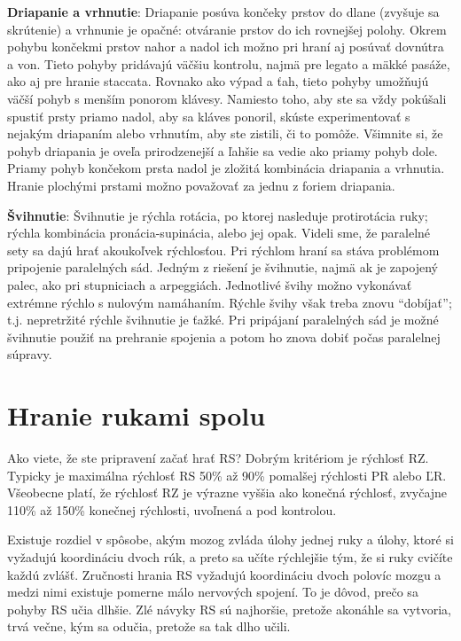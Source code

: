\documentclass[11pt,a4paper]{book}
\begin{document}
\textbf{Driapanie a vrhnutie}: Driapanie posúva končeky prstov do dlane (zvyšuje sa skrútenie) a vrhnunie je opačné: otváranie prstov do ich rovnejšej polohy. Okrem pohybu končekmi prstov nahor a nadol ich možno pri hraní aj posúvať dovnútra a von. Tieto pohyby pridávajú väčšiu kontrolu, najmä pre legato a mäkké pasáže, ako aj pre hranie staccata. Rovnako ako výpad a ťah, tieto pohyby umožňujú väčší pohyb s menším ponorom klávesy. Namiesto toho, aby ste sa vždy pokúšali spustiť prsty priamo nadol, aby sa kláves ponoril, skúste experimentovať s nejakým driapaním alebo vrhnutím, aby ste zistili, či to pomôže. Všimnite si, že pohyb driapania je oveľa prirodzenejší a ľahšie sa vedie ako priamy pohyb dole. Priamy pohyb končekom prsta nadol je zložitá kombinácia driapania a vrhnutia. Hranie plochými prstami možno považovať za jednu z foriem driapania.

\textbf{Švihnutie}: Švihnutie je rýchla rotácia, po ktorej nasleduje protirotácia ruky; rýchla kombinácia pronácia-supinácia, alebo jej opak. Videli sme, že paralelné sety sa dajú hrať akoukoľvek rýchlosťou. Pri rýchlom hraní sa stáva problémom pripojenie paralelných sád. Jedným z riešení je švihnutie, najmä ak je zapojený palec, ako pri stupniciach a arpeggiách. Jednotlivé švihy možno vykonávať extrémne rýchlo s nulovým namáhaním. Rýchle švihy však treba znovu “dobíjať”; t.j. nepretržité rýchle švihnutie je ťažké. Pri pripájaní paralelných sád je možné švihnutie použiť na prehranie spojenia a potom ho znova dobiť počas paralelnej súpravy.

\section{Hranie rukami spolu}\label{s:hands-together}
Ako viete, že ste pripravení začať hrať RS? Dobrým kritériom je rýchlosť RZ. Typicky je maximálna rýchlosť RS 50\% až 90\% pomalšej rýchlosti PR alebo ĽR. Všeobecne platí, že rýchlosť RZ je výrazne vyššia ako konečná rýchlosť, zvyčajne 110\% až 150\% konečnej rýchlosti, uvoľnená a pod kontrolou.

Existuje rozdiel v spôsobe, akým mozog zvláda úlohy jednej ruky a úlohy, ktoré si vyžadujú koordináciu dvoch rúk, a preto sa učíte rýchlejšie tým, že si ruky cvičíte každú zvlášť. Zručnosti hrania RS vyžadujú koordináciu dvoch polovíc mozgu a medzi nimi existuje pomerne málo nervových spojení. To je dôvod, prečo sa pohyby RS učia dlhšie. Zlé návyky RS sú najhoršie, pretože akonáhle sa vytvoria, trvá večne, kým sa odučia, pretože sa tak dlho učili.
\end{document}
